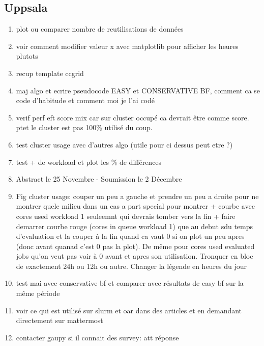 \documentclass[a4paper]{article}
\begin{document}
	\subsection{Uppsala}
		\begin{enumerate}
script a lancé à midi
oarsub -p nova -l core=16,walltime=14:00:00 -r '2022-11-15 19:00:00' "bash Compare_Conservative_Backfill_Save.sh inputs/workloads/converted/2022-06-29--06-29_V9271 inputs/clusters/rackham_450_128_32_256_4_1024.txt 0 1 8470058"



			\item plot ou comparer nombre de reutilisations de données
			\item voir comment modifier valeur x avec matplotlib pour afficher les heures plutots
			\item recup template ccgrid
			\item maj algo et ecrire pseudocode EASY et CONSERVATIVE BF, comment ca se code d'habitude et comment moi je l'ai codé
			\item verif perf eft score mix car sur cluster occupé ca devrait être comme score. ptet le cluster est pas 100\% utilisé du coup.
			\item test cluster usage avec d'autres algo (utile pour ci dessus peut etre ?)
			\item test + de workload et plot les \% de différences
			\item Abstract le 25 Novembre - Soumission le 2 Décembre
			\item Fig cluster usage: couper un peu a gauche et prendre un peu a droite pour ne montrer quele milieu dans un cas a part special pour montrer + courbe avec cores used workload 1 seuleemnt qui devrais tomber vers la fin + faire demarrer courbe rouge (cores in queue workload 1) que au debut sdu temps d'evaluation et la couper à la fin quand ca vaut 0 si on plot un peu apres (donc avant quanad c'est 0 pas la plot). De même pour cores used evaluated jobs qu'on veut pas voir à 0 avant et apres son utilisation. Tronquer en bloc de exactement 24h ou 12h ou autre. Changer la légende en heures du jour 
			
			
			\item test mai avec conservative bf et comparer avec résultats de easy bf sur la même période
			\item voir ce qui est utilisé sur slurm et oar dans des articles et en demandant directement sur mattermost
			\item contacter gaupy si il connait des survey: att réponse
			

\end{enumerate}
\end{document}
